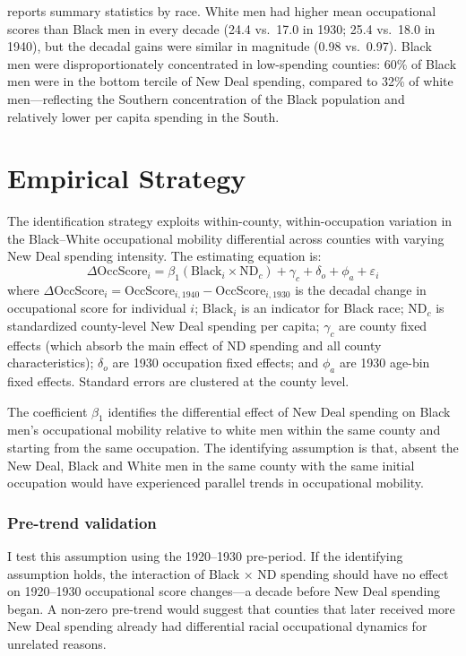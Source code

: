 \documentclass[12pt]{article}
\begin{document}


 reports summary statistics by race. White men had higher mean occupational scores than Black men in every decade (24.4 vs.\ 17.0 in 1930; 25.4 vs.\ 18.0 in 1940), but the decadal gains were similar in magnitude (0.98 vs.\ 0.97). Black men were disproportionately concentrated in low-spending counties: 60\% of Black men were in the bottom tercile of New Deal spending, compared to 32\% of white men---reflecting the Southern concentration of the Black population and relatively lower per capita spending in the South.

\section{Empirical Strategy}

The identification strategy exploits within-county, within-occupation variation in the Black--White occupational mobility differential across counties with varying New Deal spending intensity. The estimating equation is:
\begin{equation}
\Delta \text{OccScore}_{i} = \beta_1 (\text{Black}_i \times \text{ND}_c) + \gamma_c + \delta_o + \phi_a + \varepsilon_{i}
\label{eq:main}
\end{equation}
where $\Delta \text{OccScore}_{i} = \text{OccScore}_{i,1940} - \text{OccScore}_{i,1930}$ is the decadal change in occupational score for individual $i$; $\text{Black}_i$ is an indicator for Black race; $\text{ND}_c$ is standardized county-level New Deal spending per capita; $\gamma_c$ are county fixed effects (which absorb the main effect of ND spending and all county characteristics); $\delta_o$ are 1930 occupation fixed effects; and $\phi_a$ are 1930 age-bin fixed effects. Standard errors are clustered at the county level.

The coefficient $\beta_1$ identifies the differential effect of New Deal spending on Black men's occupational mobility relative to white men within the same county and starting from the same occupation. The identifying assumption is that, absent the New Deal, Black and White men in the same county with the same initial occupation would have experienced parallel trends in occupational mobility.

\subsubsection*{Pre-trend validation} I test this assumption using the 1920--1930 pre-period. If the identifying assumption holds, the interaction of Black $\times$ ND spending should have no effect on 1920--1930 occupational score changes---a decade before New Deal spending began. A non-zero pre-trend would suggest that counties that later received more New Deal spending already had differential racial occupational dynamics for unrelated reasons.
\end{document}
